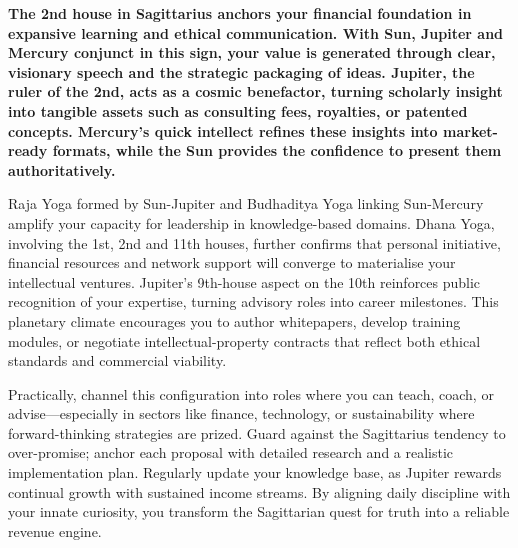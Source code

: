
\label{topic22}

{\fontsize{9.5}{13.8}\selectfont\bfseries\color{DeepSlate} The 2nd house in Sagittarius anchors your financial foundation in expansive learning and ethical communication. With Sun, Jupiter and Mercury conjunct in this sign, your value is generated through clear, visionary speech and the strategic packaging of ideas. Jupiter, the ruler of the 2nd, acts as a cosmic benefactor, turning scholarly insight into tangible assets such as consulting fees, royalties, or patented concepts. Mercury's quick intellect refines these insights into market-ready formats, while the Sun provides the confidence to present them authoritatively.}\par\vspace{2mm}

{\fontsize{9}{13}\selectfont Raja Yoga formed by Sun-Jupiter and Budhaditya Yoga linking Sun-Mercury amplify your capacity for leadership in knowledge-based domains. Dhana Yoga, involving the 1st, 2nd and 11th houses, further confirms that personal initiative, financial resources and network support will converge to materialise your intellectual ventures. Jupiter's 9th-house aspect on the 10th reinforces public recognition of your expertise, turning advisory roles into career milestones. This planetary climate encourages you to author whitepapers, develop training modules, or negotiate intellectual-property contracts that reflect both ethical standards and commercial viability.}\par\vspace{1.8mm}

{\fontsize{9}{13}\selectfont Practically, channel this configuration into roles where you can teach, coach, or advise---especially in sectors like finance, technology, or sustainability where forward-thinking strategies are prized. Guard against the Sagittarius tendency to over-promise; anchor each proposal with detailed research and a realistic implementation plan. Regularly update your knowledge base, as Jupiter rewards continual growth with sustained income streams. By aligning daily discipline with your innate curiosity, you transform the Sagittarian quest for truth into a reliable revenue engine.}\par\vspace{1.8mm}

